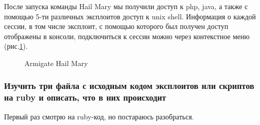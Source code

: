 \documentclass[10pt,a4paper,titlepage]{article}
\begin{document}
После запуска команды Hail Mary мы получили доступ к php, java, а также с помощью 5-ти различных эксплоитов доступ к unix shell. Информация о каждой сессии, в том числе эксплоит, с помощью которого был получен доступ отображены в консоли, подключиться к сессии можно через контекстное меню (рис.\ref{ris:image9}).
\begin{figure}[h]	
\caption{Armigate Hail Mary}
\label{ris:image9}
\end{figure}

\subsubsection{Изучить три файла с исходным кодом эксплоитов или скриптов на ruby и описать, что в них происходит}
Первый раз смотрю на ruby-код, но постараюсь разобраться.
\end{document}
